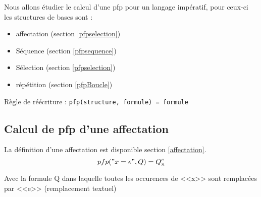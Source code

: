 		Nous allons étudier le calcul d'une pfp pour un langage impératif, pour ceux-ci les structures de bases sont :
			\begin{itemize}
				\item affectation (section \ref{pfpselection})
				\item Séquence (section \ref{pfpsequence})
				\item Sélection (section \ref{pfpselection})
				\item répétition (section \ref{pfpBoucle})
			\end{itemize}

		Règle de réécriture : \texttt{pfp(structure, formule) = formule}

		\subsection{Calcul de pfp d'une affectation}\label{pfpaffectation}
		La définition d'une affectation est disponible section \ref{affectation}.
	$$pfp("x=e", Q) = Q^e_n$$

	Avec la formule Q dans laquelle toutes les occurences de <<x>> sont remplacées par <<e>> (remplacement textuel)
